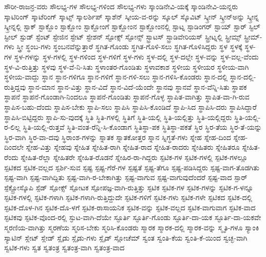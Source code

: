 {ಸೌರೀ-ರಾಜನ್ರ-ವರು
ಸೌಲಭ್ಯ-ಗಳ
ಸೌಲಭ್ಯ-ಗಳಿಂದ
ಸೌಲಭ್ಯ-ಗಳು
ಸ್ಕಾಂಡಿನೇವಿ-ಯಕ್ಕೆ
ಸ್ಕಾಂಡಿನೇವಿ-ಯನ್ನರು
ಸ್ಕಾಟಿರಿಂಗ್
ಸ್ಕಾಟೆರಿಂಗ್
ಸ್ಕಾಟ್ಸ್
ಸ್ಕಾಲರ್ಶಿಪ್
ಸ್ಕಾಶೆನ್
ಸ್ಕೀಯ-ವ-ರನ್ನು
ಸ್ಕೂಲ್
ಸ್ಕೊವಿಟ್
ಸ್ಕ್ರೀನ್
ಸ್ಕ್ರೀನ್ಅನ್ನು
ಸ್ಕ್ರೀನ್ನ
ಸ್ಕ್ರೀನ್ನಲ್ಲಿ
ಸ್ಟಾಕ್
ಸ್ಟಾಕ್ಹೊಂ
ಸ್ಟಾಕ್ಹೋಂ
ಸ್ಟಾಕ್ಹೋಂಗೆ
ಸ್ಟಾಕ್ಹೋಂನ
ಸ್ಟಾಕ್ಹೋಂನಲ್ಲಿ
ಸ್ಟಾಟ್ನ
ಸ್ಟಾಡಿಂಗರ್
ಸ್ಟಾಯ್
ಸ್ಟಾರ್
ಸ್ಟಿಲ್
ಸ್ಟೀಲ್
ಸ್ಟುಡ್
ಸ್ಟೆಂಟ್
ಸ್ಟೇಜಿನ
ಸ್ಟೇಟ್
ಸ್ಟೇಶನ್
ಸ್ಟೋಕ್ಸ್
ಸ್ಟೋನ್ಸ್
ಸ್ಟ್ರಾಟಸ್
ಸ್ಟ್ರಾಡಿವೇರಿಯಸ್
ಸ್ಟ್ರೀಟ್ನಲ್ಲಿ
ಸ್ಟ್ರೀಮ್ಸ್
ಸ್ಟ್ರೀಮ್-ಗಳು
ಸ್ತ್ರೀ
ಸ್ಥಂಬ-ಗಳು
ಸ್ಥಂಬನವೆನ್ನುತ್ತಾರೆ
ಸ್ಥಗಿತ-ಗೊಂಡು
ಸ್ಥಗಿತ-ಗೊಳಿ-ಸಲು
ಸ್ಥಗಿತ-ಗೊಳಿಸಿದ್ದರು
ಸ್ಥಳ
ಸ್ಥಳಕ್ಕೆ
ಸ್ಥಳ-ಗಳ
ಸ್ಥಳ-ಗಳನ್ನು
ಸ್ಥಳ-ಗಳಲ್ಲಿ
ಸ್ಥಳ-ಗಳಿಂದ
ಸ್ಥಳ-ಗಳಿಗೆ
ಸ್ಥಳ-ಗಳು
ಸ್ಥಳ-ದಲ್ಲಿ
ಸ್ಥಳ-ದಲ್ಲೇ
ಸ್ಥಳ-ವನ್ನು
ಸ್ಥಳ-ವಲ್ಲ-ವೆಂದು
ಸ್ಥಳ-ವಿ-ರುತ್ತಿತ್ತು
ಸ್ಥಳವು
ಸ್ಥಳ-ವೆ-ನಿ-ಸಿತು
ಸ್ಥಳಾಂತರ-ಗೊಂಡಿತು
ಸ್ಥಳಾವಕಾಶ
ಸ್ಥಳೀಯ
ಸ್ಥಳೀಯರ
ಸ್ಥಳೀಯ-ವಾಗಿ
ಸ್ಥಳೀಯ-ವಾದ್ದು
ಸ್ಥಾನ
ಸ್ಥಾನ-ಗಳಿಗೂ
ಸ್ಥಾನ-ಗಳಿಗೆ
ಸ್ಥಾನ-ಗಳಿ-ಸಲು
ಸ್ಥಾನ-ಗಳಿಸಿ-ಕೊಂಡರು
ಸ್ಥಾನ-ದಲ್ಲಿ
ಸ್ಥಾನ-ದಲ್ಲಿ-ರುತ್ತಿದ್ದವು
ಸ್ಥಾನ-ಮಾನ
ಸ್ಥಾನ-ವಿತ್ತು
ಸ್ಥಾನ-ವಿದೆ
ಸ್ಥಾನ-ವಿದೆ-ಯೆಂದೇ
ಸ್ಥಾನವು
ಸ್ಥಾನವೆ
ಸ್ಥಾನ-ವೆನ್ನಿ-ಸಿತು
ಸ್ಥಾಪಕ
ಸ್ಥಾಪನೆ
ಸ್ಥಾಪನೆ-ಗೊಂಡಾಗಿ-ನಿಂದಲೂ
ಸ್ಥಾಪನೆ-ಗೊಂಡಿತು
ಸ್ಥಾಪನೆ-ಗೊಳ್ಳ
ಸ್ಥಾಪಿತ-ವಾಗಿತ್ತು
ಸ್ಥಾಪಿತ-ವಾ-ಗಿ-ರುವ
ಸ್ಥಾಪಿಸ-ಬಹು-ದೆಂದು
ಸ್ಥಾಪಿಸ-ಬೇಕು
ಸ್ಥಾಪಿ-ಸಲು
ಸ್ಥಾಪಿಸಿ
ಸ್ಥಾಪಿಸಿ-ಕೊಂಡಿದೆ
ಸ್ಥಾಪಿ-ಸಿದ
ಸ್ಥಾಪಿಸಿ-ದರು
ಸ್ಥಾಪಿಸಿದ್ದಾರೆ
ಸ್ಥಾಪಿಸಿ-ಬಿಟ್ಟಿದ್ದರು
ಸ್ಥಾಪಿ-ಸು-ವುದಕ್ಕೆ
ಸ್ಥಿತಿ
ಸ್ಥಿತಿ-ಗಳಲ್ಲಿ
ಸ್ಥಿತಿಗೆ
ಸ್ಥಿತಿ-ಯಲ್ಲಿ
ಸ್ಥಿತಿ-ಯಲ್ಲಿತ್ತು
ಸ್ಥಿತಿ-ಯಲ್ಲಿದ್ದರು
ಸ್ಥಿತಿ-ಯಲ್ಲಿ-ರ-ಲಿಲ್ಲ
ಸ್ಥಿತಿ-ಯಲ್ಲಿ-ರುತ್ತವೆ
ಸ್ಥಿತಿ-ವಂತ-ರೆನ್ನಿ-ಸಿ-ಕೊಂಡಾಗ
ಸ್ಥಿತಿಸ್ಥಾ-ಪಕ
ಸ್ಥಿತಿಸ್ಥಾ-ಪಕತೆ
ಸ್ಥಿರ
ಸ್ಥಿರ-ತೆಯ
ಸ್ಥಿರ-ತೆ-ಯನ್ನು
ಸ್ಥಿರ-ವಾಗಿ
ಸ್ಥಿರ-ವಾ-ದವು
ಸ್ಥಿರಾಂಶ-ಗಳನ್ನು
ಸ್ನಾತಕ
ಸ್ನಾತಕೋತ್ತರ
ಸ್ನಾನ
ಸ್ನಿಗ್ಧತೆ-ಗಳು
ಸ್ನೇಹ
ಸ್ನೇಹ-ದಿಂದ
ಸ್ನೇಹ-ದಿಂದಲೇ
ಸ್ನೇಹ-ವಿತ್ತು
ಸ್ನೇಹವು
ಸ್ನೇಹಿತ
ಸ್ನೇಹಿತ-ರಾಗಿ
ಸ್ನೇಹಿತ-ರಾದ
ಸ್ನೇಹಿತ-ರಾದರು
ಸ್ನೇಹಿತರು
ಸ್ನೇಹಿತರೂ
ಸ್ನೇಹಿತ-ರೆಂದು
ಸ್ನೇಹಿತ-ರೆಲ್ಲಾ
ಸ್ನೇಹಿತರೇ
ಸ್ನೇಹಿತ-ರೊಡನೆ
ಸ್ನೇಹಿರ-ರಾ-ಗಿದ್ದರು
ಸ್ಪಟಿಕ-ಗಳ
ಸ್ಪಟಿಕ-ಗಳಲ್ಲಿ
ಸ್ಪಟಿಕ-ಗಳಲ್ಲೂ
ಸ್ಪಟಿಕದ
ಸ್ಪಟಿಕ-ವಲ್ಲದ
ಸ್ಪರ್ಶಿ-ಸುವ
ಸ್ಪಷ್ಟ
ಸ್ಪಷ್ಟ-ಗೆರೆ-ಗಳ
ಸ್ಪಷ್ಟತೆ
ಸ್ಪಷ್ಟ-ತೆಗೂ
ಸ್ಪಷ್ಟ-ಪಡಿಸಿದ್ದರು
ಸ್ಪಷ್ಟ-ವಾಗ-ತೊಡಗಿತು
ಸ್ಪಷ್ಟ-ವಾಗಿ
ಸ್ಪಷ್ಟ-ವಾಗಿದ್ದಿತು
ಸ್ಪಷ್ಟ-ವಾಗಿ-ರ-ಬೇಕಾಗಿತ್ತು
ಸ್ಪಷ್ಟ-ವಾಗುವ
ಸ್ಪಷ್ಟ-ವಾಗುವುದೆಂದರೆ
ಸ್ಪಷ್ಟ-ವಾದ
ಸ್ಪಾರ್
ಸ್ಪೆಕ್ಟ್ರೋಸ್ಕೊಪಿ
ಸ್ಪೆಡ್
ಸ್ಪೋಕ್ಸ್
ಸ್ಪೋಟಕ
ಸ್ಪೋಪಜ್ಞ-ವಾಗಿ-ರುತ್ತಿತ್ತು
ಸ್ಫಟಿಕ
ಸ್ಫಟಿಕ-ಗಳ
ಸ್ಫಟಿಕ-ಗಳನ್ನು
ಸ್ಫಟಿಕ-ಗ-ಳನ್ನೂ
ಸ್ಫಟಿಕ-ಗಳಲ್ಲಿ
ಸ್ಫಟಿಕ-ಗಳಾಗಿ
ಸ್ಫಟಿಕ-ಗಳಾಗಿ-ರುತ್ತಿದ್ದುದೇ
ಸ್ಫಟಿಕ-ಗಳಿಗೆ
ಸ್ಫಟಿಕ-ಗಳು
ಸ್ಫಟಿಕ-ಗಳೇ
ಸ್ಫಟಿಕದ
ಸ್ಫಟಿಕ-ದಲ್ಲಿ
ಸ್ಫಟಿಕ-ದೊಳ-ಗಿನ
ಸ್ಫಟಿಕ-ದೊ-ಳಗೆ
ಸ್ಫಟಿಕ-ರಾಸಾಯನಿಕ
ಸ್ಫಟಿಕ-ವನ್ನು
ಸ್ಫಟಿಕ-ವಲ್ಲದ
ಸ್ಫಟಿಕ-ವಾಗುವಾಗ
ಸ್ಫಟಿಕ-ವಾದ
ಸ್ಫಟಿಕವು
ಸ್ಫಟಿಕ-ವೊಂದ-ರಲ್ಲಿ
ಸ್ಫುಟ-ವಾಗಿ-ದೆಯೇ
ಸ್ಫೂರ್ತಿ
ಸ್ಫೂರ್ತಿ-ಗೊಂಡು
ಸ್ಫೂರ್ತಿ-ದಾ-ಯಕ
ಸ್ಫೂರ್ತಿ-ದಾ-ಯಕವೇ
ಸ್ಮರಣಿಯ-ವಾಗಿತ್ತು
ಸ್ಮರಣೆಯ
ಸ್ಮರಿಸ-ಬೇಕು
ಸ್ಮರಿಸಿ-ಕೊಂಡರು
ಸ್ಮಾರಕ
ಸ್ಮಾರಕ-ದಲ್ಲಿ
ಸ್ಮಾರಕ-ವನ್ನು
ಸ್ಮೃತಿ-ಗಳೂ
ಸ್ಯಾಂಕಿ
ಸ್ಯಾಟಿನ್
ಸ್ಲೇಟ್
ಸ್ಲೇಡ್
ಸ್ಲೈಡು
ಸ್ಲೈಡು-ಗಳು
ಸ್ಲೈಡ್
ಸ್ಲೋಚೆಮ್
ಸ್ವಂತ
ಸ್ವಂತಿ-ಕೆಯ
ಸ್ವಂತಿ-ಕೆ-ಯಿಂದ
ಸ್ವಚ್ಛ-ವಾಗಿ
ಸ್ವಟಿಕ-ಗಳು
ಸ್ವತ
ಸ್ವತಂತ್ರ
ಸ್ವತಂತ್ರ-ವಾಗಿ
ಸ್ವತಂತ್ರ-ವಾದ
}
